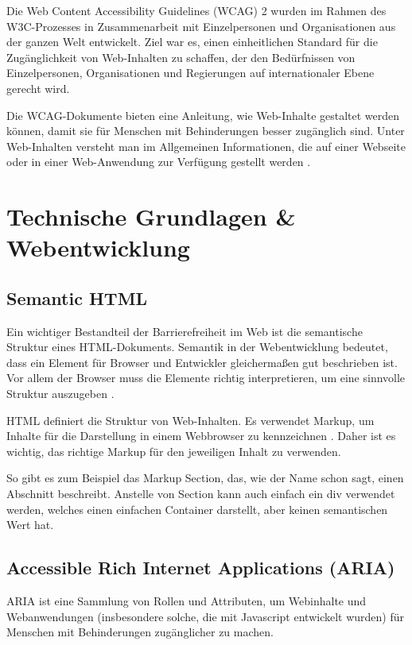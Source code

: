 Die Web Content Accessibility Guidelines (WCAG) 2 wurden im Rahmen des W3C-Prozesses in Zusammenarbeit mit Einzelpersonen und Organisationen aus der ganzen Welt entwickelt. Ziel war es, einen einheitlichen Standard für die Zugänglichkeit von Web-Inhalten zu schaffen, der den Bedürfnissen von Einzelpersonen, Organisationen und Regierungen auf internationaler Ebene gerecht wird.

Die WCAG-Dokumente bieten eine Anleitung, wie Web-Inhalte gestaltet werden können, damit sie für Menschen mit Behinderungen besser zugänglich sind. Unter Web-Inhalten versteht man im Allgemeinen Informationen, die auf einer Webseite oder in einer Web-Anwendung zur Verfügung gestellt werden \parencite{w3c_wcag_2024}.

\section{Technische Grundlagen \& Webentwicklung}

\subsection{Semantic HTML}

Ein wichtiger Bestandteil der Barrierefreiheit im Web ist die semantische Struktur eines HTML-Dokuments. Semantik in der Webentwicklung bedeutet, dass ein Element für Browser und Entwickler gleichermaßen gut beschrieben ist. Vor allem der Browser muss die Elemente richtig interpretieren, um eine sinnvolle Struktur auszugeben \parencite[vgl.][]{mdn_semanticshtml_nodate}. 

HTML definiert die Struktur von Web-Inhalten. Es verwendet Markup, um Inhalte für die Darstellung in einem Webbrowser zu kennzeichnen \parencite[vgl.][]{mdn_html_nodate}. Daher ist es wichtig, das richtige Markup für den jeweiligen Inhalt zu verwenden.

So gibt es zum Beispiel das Markup \glqq Section\grqq, das, wie der Name schon sagt, einen Abschnitt beschreibt. Anstelle von \glqq Section\grqq{}  kann auch einfach ein \glqq div\grqq{} verwendet werden, welches einen einfachen Container darstellt, aber keinen semantischen Wert hat.

\subsection{Accessible Rich Internet Applications (ARIA)}
ARIA ist eine Sammlung von Rollen und Attributen, um Webinhalte und Webanwendungen (insbesondere solche, die mit Javascript entwickelt wurden) für Menschen mit Behinderungen zugänglicher zu machen.

